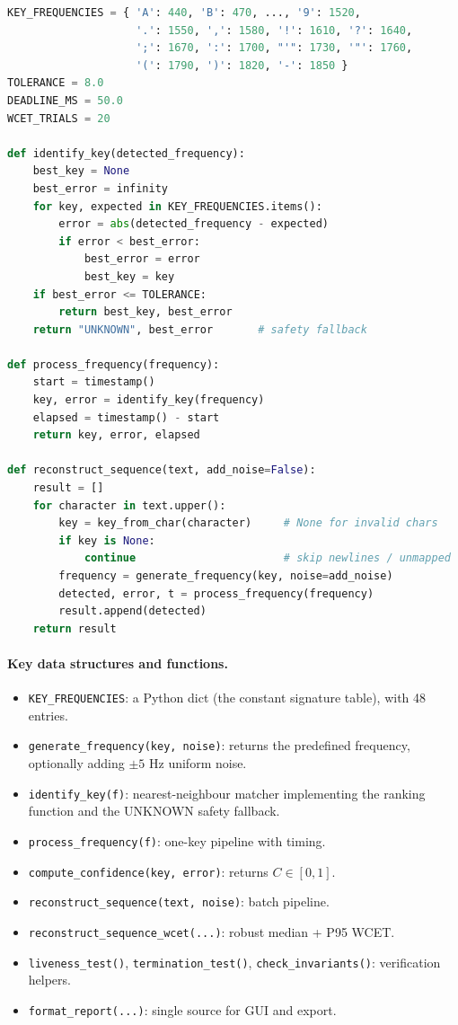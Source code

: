 \documentclass[11pt,a4paper]{article}
\begin{document}
\begin{lstlisting}[language=Python, caption={Core reconstruction pipeline.},
    label={lst:core}]
KEY_FREQUENCIES = { 'A': 440, 'B': 470, ..., '9': 1520,
                    '.': 1550, ',': 1580, '!': 1610, '?': 1640,
                    ';': 1670, ':': 1700, "'": 1730, '"': 1760,
                    '(': 1790, ')': 1820, '-': 1850 }
TOLERANCE = 8.0
DEADLINE_MS = 50.0
WCET_TRIALS = 20

def identify_key(detected_frequency):
    best_key = None
    best_error = infinity
    for key, expected in KEY_FREQUENCIES.items():
        error = abs(detected_frequency - expected)
        if error < best_error:
            best_error = error
            best_key = key
    if best_error <= TOLERANCE:
        return best_key, best_error
    return "UNKNOWN", best_error       # safety fallback

def process_frequency(frequency):
    start = timestamp()
    key, error = identify_key(frequency)
    elapsed = timestamp() - start
    return key, error, elapsed

def reconstruct_sequence(text, add_noise=False):
    result = []
    for character in text.upper():
        key = key_from_char(character)     # None for invalid chars
        if key is None:
            continue                       # skip newlines / unmapped
        frequency = generate_frequency(key, noise=add_noise)
        detected, error, t = process_frequency(frequency)
        result.append(detected)
    return result
\end{lstlisting}

\paragraph{Key data structures and functions.}
\begin{itemize}
    \item \texttt{KEY\_FREQUENCIES}: a Python dict (the constant signature
          table), with 48 entries.
    \item \texttt{generate\_frequency(key, noise)}: returns the predefined
          frequency, optionally adding $\pm 5$ Hz uniform noise.
    \item \texttt{identify\_key(f)}: nearest-neighbour matcher implementing the
          ranking function and the UNKNOWN safety fallback.
    \item \texttt{process\_frequency(f)}: one-key pipeline with timing.
    \item \texttt{compute\_confidence(key, error)}: returns $C \in [0,1]$.
    \item \texttt{reconstruct\_sequence(text, noise)}: batch pipeline.
    \item \texttt{reconstruct\_sequence\_wcet(...)}: robust median + P95 WCET.
    \item \texttt{liveness\_test()}, \texttt{termination\_test()},
          \texttt{check\_invariants()}: verification helpers.
    \item \texttt{format\_report(...)}: single source for GUI and export.
\end{itemize}
\end{document}
